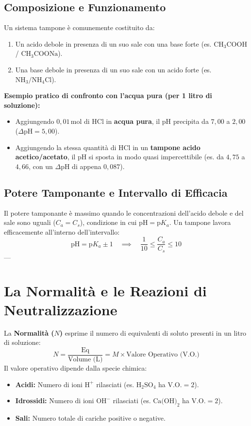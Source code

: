 \documentclass[11pt, a4paper, openright]{book}
\begin{document}
\subsection{Composizione e Funzionamento}
Un sistema tampone è comunemente costituito da:
\begin{enumerate}
    \item Un acido debole in presenza di un suo sale con una base forte (es. $\text{CH}_3\text{COOH}$ / $\text{CH}_3\text{COONa}$).
    \item Una base debole in presenza di un suo sale con un acido forte (es. $\text{NH}_3 / \text{NH}_4\text{Cl}$).
\end{enumerate}
\noindent\textbf{Esempio pratico di confronto con l'acqua pura (per 1 litro di soluzione):}
\begin{itemize}
    \item Aggiungendo $0{,}01 \, \text{mol}$ di $\text{HCl}$ in \textbf{acqua pura}, il pH precipita da $7{,}00$ a $2{,}00$ ($\Delta\text{pH} = 5{,}00$).
    \item Aggiungendo la stessa quantità di $\text{HCl}$ in un \textbf{tampone acido acetico/acetato}, il pH si sposta in modo quasi impercettibile (es. da $4{,}75$ a $4{,}66$, con un $\Delta\text{pH}$ di appena $0{,}087$).
\end{itemize}
\subsection{Potere Tamponante e Intervallo di Efficacia}
Il potere tamponante è massimo quando le concentrazioni dell'acido debole e del sale sono uguali ($C_a = C_s$), condizione in cui $\text{pH} = \text{p}K_a$. Un tampone lavora efficacemente all'interno dell'intervallo:
\begin{equation}
\text{pH} = \text{p}K_a \pm 1 \quad \implies \quad \frac{1}{10} \le \frac{C_a}{C_s} \le 10
\end{equation}
---

\section{La Normalità e le Reazioni di Neutralizzazione}
La \textbf{Normalità ($N$)} esprime il numero di equivalenti di soluto presenti in un litro di soluzione:
\begin{equation}
N = \frac{\text{Eq}}{\text{Volume (L)}} = M \times \text{Valore Operativo (V.O.)}
\end{equation}
Il valore operativo dipende dalla specie chimica:
\begin{itemize}
    \item \textbf{Acidi:} Numero di ioni $\text{H}^+$ rilasciati (es. $\text{H}_2\text{SO}_4$ ha $\text{V.O.} = 2$).
    \item \textbf{Idrossidi:} Numero di ioni $\text{OH}^-$ rilasciati (es. $\text{Ca(OH)}_2$ ha $\text{V.O.} = 2$).
    \item \textbf{Sali:} Numero totale di cariche positive o negative.
\end{itemize}
\end{document}
